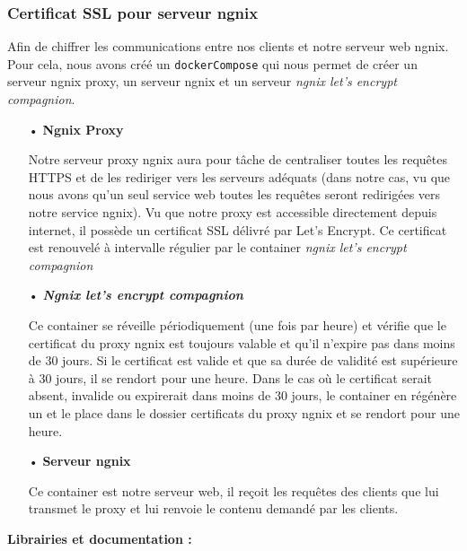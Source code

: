 \subsubsection{Certificat SSL pour serveur ngnix}

Afin de chiffrer les communications entre nos clients et notre serveur web ngnix.
Pour cela, nous avons créé un \texttt{dockerCompose} qui nous permet de créer un serveur ngnix proxy, un serveur ngnix et un serveur \emph{ngnix let's encrypt compagnion}.
\medskip

\begin{itemize}

\item[•] \textbf{Ngnix Proxy}
\vspace{1mm}

Notre serveur proxy ngnix aura pour tâche de centraliser toutes les requêtes HTTPS et de les rediriger vers les serveurs adéquats (dans notre cas, vu que nous avons qu'un seul service web toutes les requêtes seront redirigées vers notre service ngnix).
Vu que notre proxy est accessible directement depuis internet, il possède un certificat SSL délivré par Let's Encrypt.
Ce certificat est renouvelé à intervalle régulier par le container \emph{ngnix let's encrypt compagnion}
\vspace{3mm}

\item[•] \textbf{\emph{Ngnix let's encrypt compagnion}}
\vspace{1mm}

Ce container se réveille périodiquement (une fois par heure) et vérifie que le certificat du proxy ngnix est toujours valable et qu'il n'expire pas dans moins de 30 jours. 
Si le certificat est valide et que sa durée de validité est supérieure à 30 jours, il se rendort pour une heure.
Dans le cas où le certificat serait absent, invalide ou expirerait dans moins de 30 jours, le container en régénère un et le place dans le dossier certificats du proxy ngnix et se rendort pour une heure.
\vspace{3mm}

\item[•] \textbf{Serveur ngnix}
\vspace{1mm}

Ce container est notre serveur web, il reçoit les requêtes des clients que lui transmet le proxy et lui renvoie le contenu demandé par les clients.
\end{itemize}

\medskip
\textbf{Librairies et documentation :}

